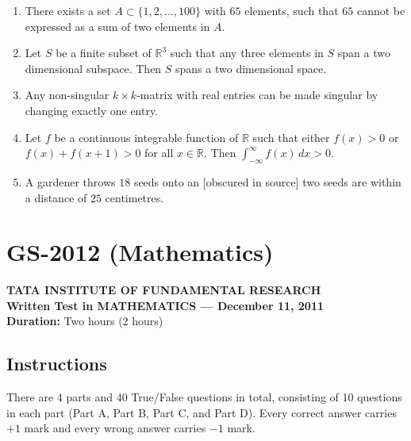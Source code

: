 \documentclass[11pt, a4paper]{article}
\begin{document}
\begin{enumerate}
  \item There exists a set $A \subset \{1, 2, \dots, 100\}$ with $65$ elements, such that $65$ cannot be expressed as a sum of two elements in $A$.
  \item Let $S$ be a finite subset of $\mathbb{R}^3$ such that any three elements in $S$ span a two dimensional subspace. Then $S$ spans a two dimensional space.
  \item Any non-singular $k \times k$-matrix with real entries can be made singular by changing exactly one entry.
  \item Let $f$ be a continuous integrable function of $\mathbb{R}$ such that either $f(x) > 0$ or $f(x) + f(x + 1) > 0$ for all $x \in \mathbb{R}$. Then $\int_{-\infty}^\infty f(x)\,dx > 0$.
  \item A gardener throws $18$ seeds onto an {[obscured in source]} two seeds are within a distance of $25$ centimetres.
\end{enumerate}

\newpage

\section{GS-2012 (Mathematics)}

\begin{center}
  \textbf{TATA INSTITUTE OF FUNDAMENTAL RESEARCH}\\
  \textbf{Written Test in MATHEMATICS --- December 11, 2011}\\
  \textbf{Duration:} Two hours (2 hours)
\end{center}

\subsection*{Instructions}
There are 4 parts and 40 True/False questions in total, consisting of 10 questions in each part (Part A, Part B, Part C, and Part D). Every correct answer carries $+1$ mark and every wrong answer carries $-1$ mark.
\end{document}
